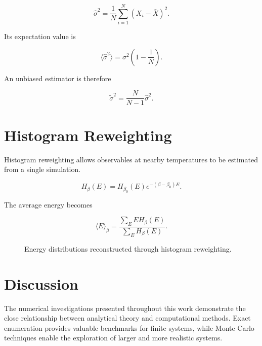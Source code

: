 \documentclass[a4paper]{article}
\begin{document}
\begin{equation}
\hat{\sigma}^2
=
\frac{1}{N}
\sum_{i=1}^{N}
(X_i-\bar{X})^2.
\end{equation}

Its expectation value is

\begin{equation}
\langle \hat{\sigma}^2 \rangle
=
\sigma^2
\left(
1-\frac{1}{N}
\right).
\end{equation}

An unbiased estimator is therefore

\begin{equation}
\tilde{\sigma}^2
=
\frac{N}{N-1}
\hat{\sigma}^2.
\end{equation}

\section{Histogram Reweighting}

Histogram reweighting allows observables at nearby temperatures to be estimated from a single simulation.

\begin{equation}
H_\beta(E)
=
H_{\beta_0}(E)
e^{-(\beta-\beta_0)E}.
\end{equation}

The average energy becomes

\begin{equation}
\langle E \rangle_\beta
=
\frac{
\sum_E E H_\beta(E)
}{
\sum_E H_\beta(E)
}.
\end{equation}

\begin{figure}[H]
\centering
{}
\caption{Energy distributions reconstructed through histogram reweighting.}
\end{figure}

\section{Discussion}

The numerical investigations presented throughout this work demonstrate the close relationship between analytical theory and computational methods. Exact enumeration provides valuable benchmarks for finite systems, while Monte Carlo techniques enable the exploration of larger and more realistic systems.
\end{document}

